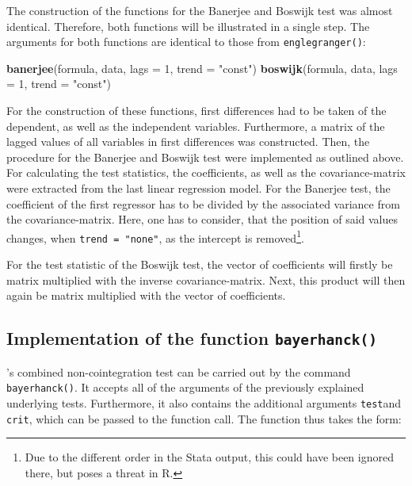 \documentclass[11pt,a4paper]{article}
\newenvironment{Shaded}{\begin{snugshade}}{\end{snugshade}}
\newcommand{\DataTypeTok}[1]{\textcolor[rgb]{0.13,0.29,0.53}{#1}}
\newcommand{\DecValTok}[1]{\textcolor[rgb]{0.00,0.00,0.81}{#1}}
\newcommand{\KeywordTok}[1]{\textcolor[rgb]{0.13,0.29,0.53}{\textbf{#1}}}
\newcommand{\NormalTok}[1]{#1}
\newcommand{\StringTok}[1]{\textcolor[rgb]{0.31,0.60,0.02}{#1}}
\let\rmarkdownfootnote\footnote%
\def\footnote{\protect\rmarkdownfootnote}
\begin{document}
The construction of the functions for the Banerjee and Boswijk test was
almost identical. Therefore, both functions will be illustrated in a
single step. The arguments for both functions are identical to those
from \texttt{englegranger()}:

\begin{Shaded}
\begin{Highlighting}[]
\KeywordTok{banerjee}\NormalTok{(formula, data, }\DataTypeTok{lags =} \DecValTok{1}\NormalTok{, }\DataTypeTok{trend =} \StringTok{"const"}\NormalTok{)}
\KeywordTok{boswijk}\NormalTok{(formula, data, }\DataTypeTok{lags =} \DecValTok{1}\NormalTok{, }\DataTypeTok{trend =} \StringTok{"const"}\NormalTok{)}
\end{Highlighting}
\end{Shaded}

For the construction of these functions, first differences had to be
taken of the dependent, as well as the independent variables.
Furthermore, a matrix of the lagged values of all variables in first
differences was constructed. Then, the procedure for the Banerjee and
Boswijk test were implemented as outlined above. For calculating the
test statistics, the coefficients, as well as the covariance-matrix were
extracted from the last linear regression model. For the Banerjee test,
the coefficient of the first regressor has to be divided by the
associated variance from the covariance-matrix. Here, one has to
consider, that the position of said values changes, when
\texttt{trend\ =\ "none"}, as the intercept is removed\footnote{Due to
  the different order in the Stata output, this could have been ignored
  there, but poses a threat in R.}.

For the test statistic of the Boswijk test, the vector of coefficients
will firstly be matrix multiplied with the inverse covariance-matrix.
Next, this product will then again be matrix multiplied with the vector
of coefficients.

\hypertarget{implementation-of-the-function-bayerhanck}{%
\subsection{\texorpdfstring{Implementation of the function
\texttt{bayerhanck()}}{Implementation of the function bayerhanck()}}\label{implementation-of-the-function-bayerhanck}}

\textcite{Bayerhanck2009}'s combined non-cointegration test can be
carried out by the command \texttt{bayerhanck()}. It accepts all of the
arguments of the previously explained underlying tests. Furthermore, it
also contains the additional arguments \texttt{test}and \texttt{crit},
which can be passed to the function call. The function thus takes the
form:
\end{document}
